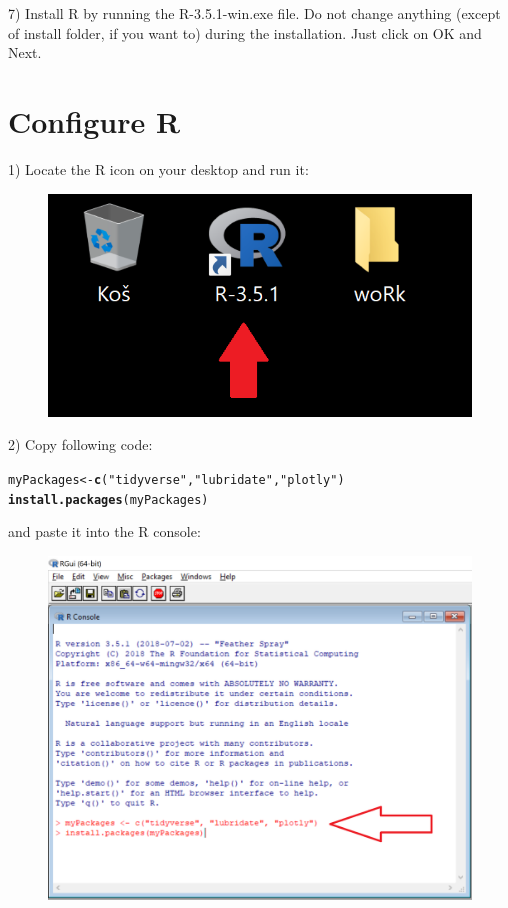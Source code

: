 \documentclass{article}\usepackage[]{graphicx}\usepackage[]{color}
\makeatletter
\newcommand{\hlstr}[1]{\textcolor[rgb]{0.192,0.494,0.8}{#1}}%
\newcommand{\hlstd}[1]{\textcolor[rgb]{0.345,0.345,0.345}{#1}}%
\newcommand{\hlkwb}[1]{\textcolor[rgb]{0.69,0.353,0.396}{#1}}%
\newcommand{\hlkwd}[1]{\textcolor[rgb]{0.737,0.353,0.396}{\textbf{#1}}}%
\newenvironment{kframe}{%
 \def\at@end@of@kframe{}%
 \ifinner\ifhmode%
  \def\at@end@of@kframe{\end{minipage}}%
  \begin{minipage}{\columnwidth}%
 \fi\fi%
 \def\FrameCommand##1{\hskip\@totalleftmargin \hskip-\fboxsep
 \colorbox{shadecolor}{##1}\hskip-\fboxsep
     \hskip-\linewidth \hskip-\@totalleftmargin \hskip\columnwidth}%
 \MakeFramed {\advance\hsize-\width
   \@totalleftmargin\z@ \linewidth\hsize
   \@setminipage}}%
 {\par\unskip\endMakeFramed%
 \at@end@of@kframe}
\newenvironment{knitrout}{}{} %
\makeatother
\begin{document}
7) Install R by running the R-3.5.1-win.exe file. Do not change anything (except of install folder, if you want to) during the installation. Just click on OK and Next.

\clearpage
\section{Configure R}
1) Locate the R icon on your desktop and run it:

\begin{figure}[!h]
 \includegraphics[scale=.5]{./Images/image_06.png}
\end{figure}

2) Copy following code:

\begin{knitrout}
\color{fgcolor}\begin{kframe}
\begin{alltt}
\hlstd{myPackages} \hlkwb{<-} \hlkwd{c}\hlstd{(}\hlstr{"tidyverse"}\hlstd{,} \hlstr{"lubridate"}\hlstd{,} \hlstr{"plotly"}\hlstd{)}
\hlkwd{install.packages}\hlstd{(myPackages)}
\end{alltt}
\end{kframe}
\end{knitrout}

and paste it into the R console:

\begin{figure}[!h]
 \includegraphics[width=\textwidth,height=\textheight,keepaspectratio]{./Images/image_07.png}
\end{figure}
\end{document}
